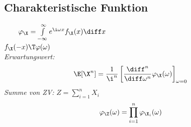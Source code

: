 \documentclass[german,color,6pt]{latex4ei/latex4ei_sheet}
\begin{document}
%	
%	
%	
%	
%	
%	

\begin{sectionbox}
	\subsection{Charakteristische Funktion} %
	\label{sub:charakteristische_funktion}
	 $\qquad \varphi_{\X} = \int\limits_{-\infty}^\infty e^{\i\omega x} f_{\X}(x) \diff x$\\
	$f_{\X}(-x) \T \varphi(\omega)$ \\
	
	\emph{Erwartungswert:}
	\begin{eqnarray*}
		\E[\X^n] = \frac{1}{\i^n} \left[\frac{\diff^n}{\diff \omega^n} \varphi_{\X}(\omega)\right]_{\omega = 0}
	\end{eqnarray*}
	\emph{Summe von ZV:} $Z=\sum_{i=1}^{n}X_i$
	\begin{eqnarray*}
		\varphi_{\Z} (\omega) = \prod_{i=1}^{n} \varphi_{\X_i} (\omega)
	\end{eqnarray*}
\end{sectionbox}	
\end{document}
